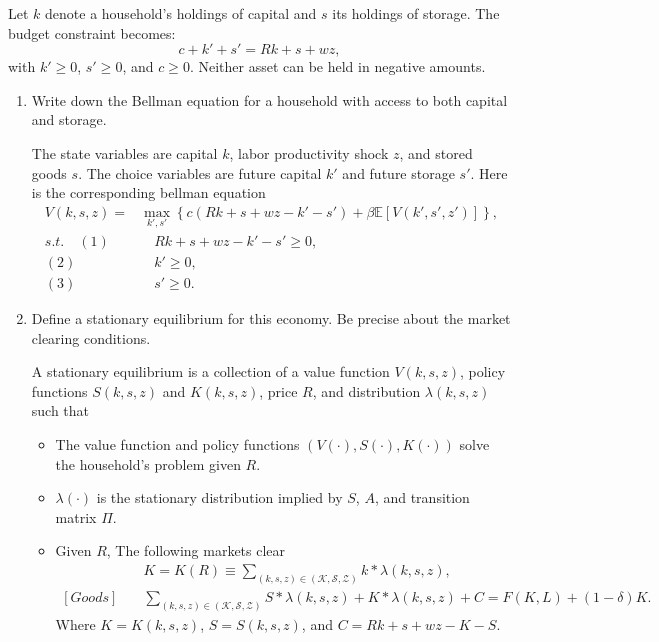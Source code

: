 \documentclass[11pt,english]{article}
\begin{document}
Let $k$ denote a household's holdings of capital and $s$ its holdings of
storage. The budget constraint becomes:
\[
    c + k' + s' = Rk + s + wz,
\]
with $k' \geq 0$, $s' \geq 0$, and $c \geq 0$. Neither asset can be held in
negative amounts.
 
\begin{enumerate}
    \item[(e)] Write down the Bellman equation for a household with access to
        both capital and storage.
    \begin{solution}
  The state variables are capital $k$, labor productivity shock $z$, and stored goods $s$. The choice variables are future capital $k'$ and future storage $s'$. Here is the corresponding bellman equation \begin{align*}
V(k, s, z) = &\max_{k', s'}\left\{c(Rk + s + wz - k' - s') + \beta \mathbb{E}[V(k', s', z')]\right\},\\
s.t.\quad (1)&\quad Rk + s + wz - k'  - s'\geq 0,\\
(2)&\quad k' \geq 0,\\
(3)&\quad s' \geq 0.
\end{align*}
    \end{solution}
 
    \item[(f)] Define a stationary equilibrium for this economy. Be precise about
        the market clearing conditions.
    \begin{solution}
 A stationary equilibrium is a collection of a value function $V(k,s,z)$, policy functions $S(k,s,z)$ and $K(k,s,z)$, price $R$, and distribution $\lambda(k,s,z)$ such that
\begin{itemize}
\item The value function and policy functions $(V(\cdot), S(\cdot), K(\cdot))$ solve the household's problem given $R$.
\item $\lambda(\cdot)$ is the stationary distribution implied by $S$, $A$, and transition matrix $\Pi$.
\item Given $R$, The following markets clear 
\begin{align*}
[Capital]&\quad K = K(R) \equiv \sum_{(k,s,z)\in (\mathcal{K}, \mathcal{S}, \mathcal{Z})}k * \lambda(k,s,z),\\
[Goods]&\quad \sum_{(k,s,z)\in (\mathcal{K}, \mathcal{S}, \mathcal{Z})} S* \lambda(k,s,z) + K*\lambda(k,s,z) + C= F(K, L) + (1 - \delta)K.
\end{align*}Where $K = K(k,s,z)$, $S = S(k,s,z)$, and $C = Rk + s + wz - K - S$.
\end{itemize}
    \end{solution}
 

\end{enumerate}
\end{document}
